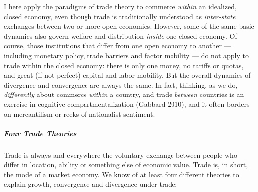 I here apply the paradigms of trade theory to commerce \emph{within} an idealized, closed economy, even though trade is traditionally understood as \emph{inter-state} exchanges between two or more open economies. However, some of the same basic dynamics also govern welfare and distribution \emph{inside} one closed economy. Of course, those institutions that differ from one open economy to another --- including monetary policy, trade barriers and factor mobility --- do not apply to trade within the closed economy: there is only one money, no tariffs or quotas, and great (if not perfect) capital and labor mobility. But the overall dynamics of divergence and convergence are always the same. In fact, thinking, as we do, \emph{differently} about commerce \emph{within} a country, and trade \emph{between} countries is an exercise in cognitive compartmentalization (Gabbard 2010), and it often borders on mercantilism or reeks of nationalist sentiment. 

\subparagraph{Four Trade Theories}  \label{sec:tradetheories} Trade is always and everywhere the voluntary exchange between people who differ in location, ability or something else of economic value. Trade is, in short, the mode of a market economy. We know of at least four different theories to explain growth, convergence and divergence under trade:

